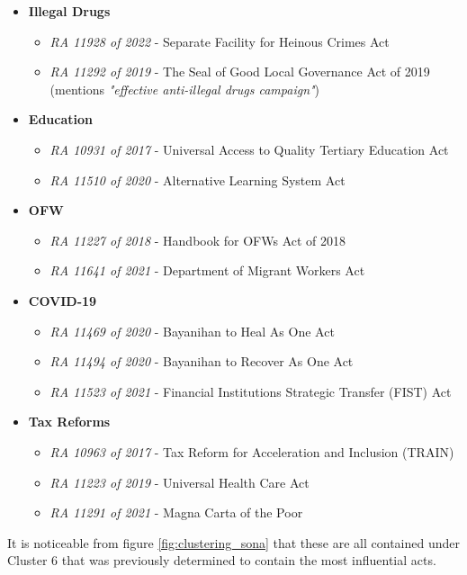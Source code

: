 \documentclass[conference]{IEEEtran}
\begin{document}
\begin{itemize}
    \item \textbf{Illegal Drugs}
    \begin{itemize}
        \item \textit{RA 11928 of 2022} - Separate Facility for Heinous Crimes Act
        \item \textit{RA 11292 of 2019} - The Seal of Good Local Governance Act of 2019 (mentions \textit{"effective anti-illegal drugs campaign"})
    \end{itemize}
    \item \textbf{Education}
    \begin{itemize}
        \item \textit{RA 10931 of 2017} - Universal Access to Quality Tertiary Education Act
        \item \textit{RA 11510 of 2020} - Alternative Learning System Act
    \end{itemize}
    \item \textbf{OFW}
    \begin{itemize}
        \item \textit{RA 11227 of 2018} - Handbook for OFWs Act of 2018
        \item \textit{RA 11641 of 2021} - Department of Migrant Workers Act
    \end{itemize}
    \item \textbf{COVID-19}
    \begin{itemize}
        \item \textit{RA 11469 of 2020} - Bayanihan to Heal As One Act
        \item \textit{RA 11494 of 2020} - Bayanihan to Recover As One Act
        \item \textit{RA 11523 of 2021} - Financial Institutions Strategic Transfer (FIST) Act
    \end{itemize}
    \item \textbf{Tax Reforms}
    \begin{itemize}
        \item \textit{RA 10963 of 2017} - Tax Reform for Acceleration and Inclusion (TRAIN)
        \item \textit{RA 11223 of 2019} - Universal Health Care Act
        \item \textit{RA 11291 of 2021} - Magna Carta of the Poor
    \end{itemize}
\end{itemize}

It is noticeable from figure \ref{fig:clustering_sona} that these are all contained under Cluster 6 that was previously determined to contain the most influential acts.
\end{document}

